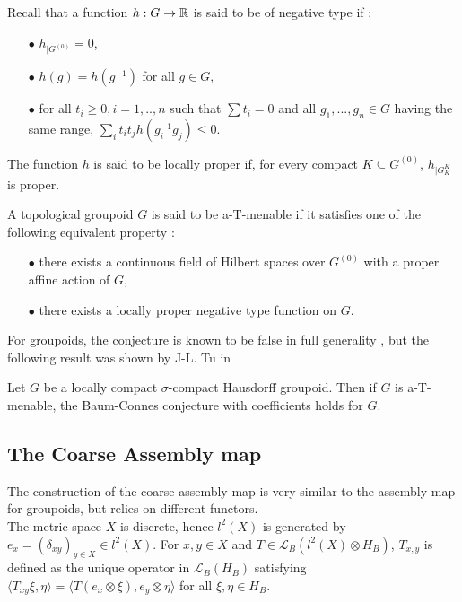 Recall that a function $h : G\rightarrow \mathbb R$ is said to be of negative type if :
\begin{itemize}
\item[$\bullet$] $h_{|G^{(0)}}=0$,
\item[$\bullet$] $h(g)=h(g^{-1})$ for all $g\in G$,
\item[$\bullet$] for all $t_i\geq 0, i=1,..,n$ such that $\sum t_i=0$ and all $g_1,...,g_n\in G$ having the same range, $\sum_i t_i t_j h(g_i^{-1} g_j )\leq 0$.
\end{itemize}
The function $h$ is said to be locally proper if, for every compact $K \subseteq G^{(0)}$, $h_{|G_K^K}$ is proper.\\

\begin{definition}
A topological groupoid $G$ is said to be a-T-menable if it satisfies one of the following equivalent property :
\begin{itemize}
\item[$\bullet$] there exists a continuous field of Hilbert spaces over $G^{(0)}$ with a proper affine action of $G$,
\item[$\bullet$] there exists a locally proper negative type function on $G$.
\end{itemize} 
\end{definition}

For groupoids, the conjecture is known to be false in full generality \cite{HigsonLaffSk}, but the following result was shown by J-L. Tu in \cite{TuThese}
\begin{thm}\label{Tu}
Let $G$ be a locally compact $\sigma$-compact Hausdorff groupoid. Then if $G$ is a-T-menable, the Baum-Connes conjecture with coefficients holds for $G$.
\end{thm}

\subsection{The Coarse Assembly map}

The construction of the coarse assembly map is very similar to the assembly map for groupoids, but relies on different functors.\\

The metric space $X$ is discrete, hence $l^2(X)$ is generated by $e_x = (\delta_{xy})_{y\in X}\in l^2(X)$. For $x,y\in X$ and $T\in \mathcal L_B(l^2(X)\otimes H_B)$, $T_{x,y}$ is defined as the unique operator in $\mathcal L_B(H_B)$ satisfying $\langle T_{xy}\xi,\eta\rangle = \langle T (e_x\otimes \xi),e_y\otimes \eta \rangle$ for all $\xi,\eta\in H_B$.\\

